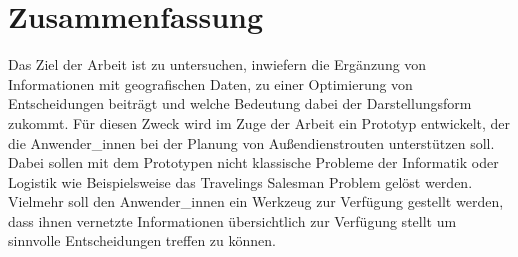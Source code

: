\documentclass[Bachelorarbeit.tex]{subfiles}
\begin{document}
\chapter*{Zusammenfassung}

Das Ziel der Arbeit ist zu untersuchen, 
inwiefern die Ergänzung  von Informationen mit geografischen Daten, 
zu einer Optimierung von Entscheidungen beiträgt und welche Bedeutung dabei der Darstellungsform zukommt. 
Für diesen Zweck wird im Zuge der Arbeit ein Prototyp entwickelt, der die Anwender\_innen bei der Planung von Außendienstrouten unterstützen soll. 
Dabei sollen mit dem Prototypen nicht klassische Probleme der Informatik oder Logistik wie Beispielsweise das Travelings Salesman Problem gelöst werden. Vielmehr soll den Anwender\_innen ein Werkzeug zur Verfügung gestellt werden, dass ihnen vernetzte Informationen übersichtlich zur Verfügung stellt um sinnvolle Entscheidungen treffen zu können.\\
\\
\end{document}
